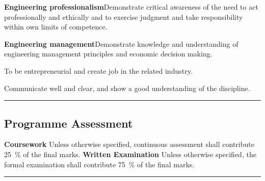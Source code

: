 \begin{outline}
    \1      \textbf{Engineering professionalism}\newline Demonstrate critical awareness of the need to act professionally and ethically and to exercise judgment and take responsibility within own limits of competence.

    \1      \textbf{Engineering management}\newline Demonstrate knowledge and understanding of engineering management principles and economic decision making.

    \1      To be entrepreneurial and create job in the related industry.

    \1       Communicate well and clear, and show a good understanding of the discipline.

\end{outline}
\vspace{2ex}\hrule\vspace{2ex}

\subsection*{Programme Assessment}
\begin{outline}
    \1 \textbf{Coursework} \newline
    Unless otherwise specified, continuous assessment shall contribute \qty{25}{\percent} of the final marks.\label{label1}
    \1 \textbf{Written Examination} \newline
    Unless otherwise specified, the formal examination shall contribute \qty{75}{\percent} of the final marks.
\end{outline}
\vspace{2ex}\hrule\vspace{2ex}

